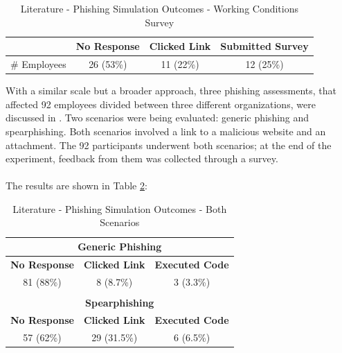 \documentclass[a4paper]{article}
\begin{document}
\smallskip

\begingroup
\renewcommand{\arraystretch}{1.25}
\begin{table}[ht]
\begin{center}
    \begin{tabular}{ | c | c | c | c | }
    \hline
    & \textbf{No Response} & \textbf{Clicked Link} & \textbf{Submitted Survey} \\ \hline
    \# Employees & 26 (53\%) & 11 (22\%) & 12 (25\%) \\ \hline
    \end{tabular}
\end{center}
\caption{Literature - Phishing Simulation Outcomes - Working Conditions Survey \cite{lit-casestudy-revisiting-susceptibility}}
\label{tb-lit3}
\end{table}
\endgroup

\newpage

\noindent
With a similar scale but a broader approach, three phishing assessments, that affected 92 employees divided between three different organizations, were discussed in \cite{lit-casestudy-survey-virus}. Two scenarios were being evaluated: generic phishing and spearphishing. Both scenarios involved a link to a malicious website and an attachment. The 92 participants underwent both scenarios; at the end of the experiment, feedback from them was collected through a survey. 
\\ \\
The results are shown in Table \ref{tb-lit4}:

\smallskip

\begingroup
\renewcommand{\arraystretch}{1.25}
\begin{table}[ht]
\begin{center}
    \begin{tabular}{ | c | c | c | }
    \hline
    \multicolumn{3}{|c|}{\textbf{Generic Phishing}} \\ \hline
    \textbf{No Response} & \textbf{Clicked Link} & \textbf{Executed Code} \\ \hline
    81 (88\%) & 8 (8.7\%) & 3 (3.3\%) \\ \hline
    \multicolumn{3}{c}{} \\ \hline
    \multicolumn{3}{|c|}{\textbf{Spearphishing}} \\ \hline
    \textbf{No Response} & \textbf{Clicked Link} & \textbf{Executed Code} \\ \hline
    57 (62\%) & 29 (31.5\%) & 6 (6.5\%) \\ \hline
    \end{tabular}
\end{center}
\caption{Literature - Phishing Simulation Outcomes - Both Scenarios \cite{lit-casestudy-survey-virus}}
\label{tb-lit4}
\end{table}
\endgroup
\end{document}
